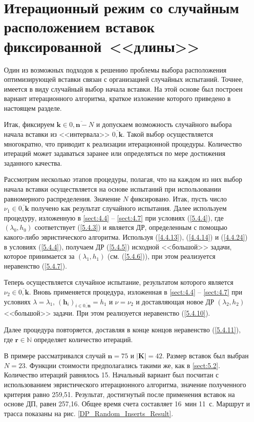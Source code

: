 
\section{
  Итерационный режим
  со случайным расположением вставок
  фиксированной~<<длины>>
}
\label{sect:5.5}
\setcounter{equation}{0}

Один из возможных подходов к решению проблемы выбора расположения оптимизирующей
вставки связан с организацией случайных испытаний.
Точнее, имеется в виду случайный выбор начала вставки.
На этой основе был построен вариант итерационного алгоритма,
краткое изложение которого приведено в настоящем разделе.

Итак, фиксируем
$\mathbf{k}\in \overline{0,\mathbf{n}-N}$
и допускаем возможность
случайного выбора начала вставки из <<интервала>> $\overline{0,\mathbf{k}}$.
Такой выбор осуществляется многократно,
что приводит к реализации итерационной процедуры.
Количество итераций может задаваться заранее или определяться
по мере достижения заданного качества.

Рассмотрим несколько этапов процедуры,
полагая, что на каждом из них выбор начала вставки осуществляется
на основе испытаний при использовании равномерного распределения.
Значение $N$ фиксировано.
Итак, пусть число
$\nu_1\in \overline{0,\mathbf{k}}$
получено как результат случайного испытания.
Далее используем процедуру, изложенную в \ref{sect:4.4} -- \ref{sect:4.7}
при условиях (\ref{5.4.4}),
где $(\lambda_0,h_0)$
соответствует (\ref{5.4.3})
и является ДР, определенным с помощью какого-либо эвристического алгоритма.
Используя
(\ref{4.4.13}), (\ref{4.4.14}) и (\ref{4.4.24})
в условиях (\ref{5.4.4}),
получаем ДР (\ref{5.4.5}) исходной <<большой>> задачи,
которое принимается за
$(\lambda_1,h_1)$
(см. (\ref{5.4.6})),
при этом реализуется неравенство (\ref{5.4.7}).

Теперь осуществляется случайное испытание,
результатом которого является
$\nu_2\in \overline{0,\mathbf{k}}$.
Вновь применяется процедура, изложенная
в \ref{sect:4.4} -- \ref{sect:4.7}
при условиях
$\lambda=\lambda_1$,
$(\mathbf{h}_i)_{i\in \overline{0,\mathbf{n}}}=h_1$ и
$\nu=\nu_2$
и доставляющая новое ДР
$(\lambda_2,h_2)$ <<большой>> задачи.
При этом реализуется неравенство
(\ref{5.4.10}).

Далее процедура повторяется,
доставляя в конце концов неравенство (\ref{5.4.11}),
где $\mathbf{r}\in \mathbb{N}$ определяет количество итераций.

В примере рассматривался случай
$\mathbf{n}=75$ и $|\mathbf{K}|=42$.
Размер вставок был выбран
$N=23$.
Функции стоимости предполагались такими же,
как в
\ref{sect:5.2}.
Количество итераций равнялось 15.
Начальный вариант был посчитан с использованием
эвристического итерационного алгоритма,
значение полученного критерия равно 259,51.
Результат, достигнутый после применения вставок на основе ДП, равен 257,16.
Общее время счета составляет 16~мин 11~с.
Маршрут и трасса показаны на рис.
\ref{DP_Random_Inserts_Result}.

